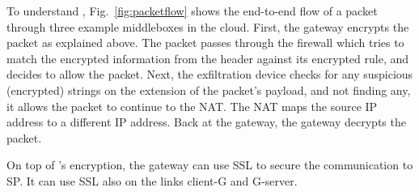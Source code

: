 To understand \sys, Fig.~\ref{fig:packetflow} shows the end-to-end flow of a packet through three example middleboxes in the cloud.  First,  the gateway encrypts the packet as explained above. The packet passes through the firewall which tries to match the encrypted information from the header against its encrypted rule, and decides to allow the packet. Next, the exfiltration device checks for any suspicious (encrypted) strings on the extension of the packet's payload, and not finding any, it allows the packet  to continue to the NAT. The NAT maps the source IP address to a different IP address. Back at the gateway, the gateway decrypts the packet. 

On top of \sys's encryption, the gateway can use SSL  to secure the communication to SP.  It can use SSL also on the links client-G and G-server.



